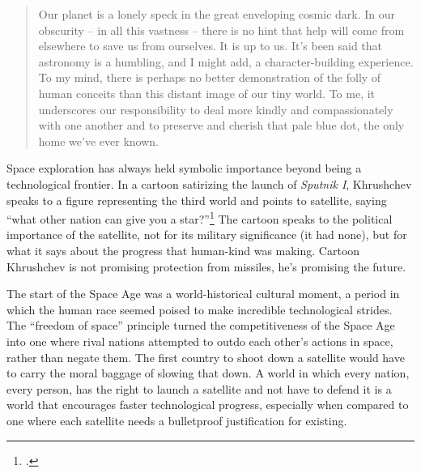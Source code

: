 \documentclass[11pt]{memoir}
\begin{document}
\begin{quote}
Our planet is a lonely speck in the great enveloping cosmic dark. In our obscurity – in all this vastness – there is no hint that help will come from elsewhere to save us from ourselves. It is up to us. It's been said that astronomy is a humbling, and I might add, a character-building experience. To my mind, there is perhaps no better demonstration of the folly of human conceits than this distant image of our tiny world. To me, it underscores our responsibility to deal more kindly and compassionately with one another and to preserve and cherish that pale blue dot, the only home we've ever known.
\end{quote}

Space exploration has always held symbolic importance beyond being a technological frontier. In a cartoon satirizing the launch of \emph{Sputnik I}, Khrushchev speaks to a figure representing the third world and points to satellite, saying ``what other nation can give you a star?''\footcite{mcdougall_heavens_1985} The cartoon speaks to the political importance of the satellite, not for its military significance (it had none), but for what it says about the progress that human-kind was making. Cartoon Khrushchev is not promising protection from missiles, he's promising the future.

The start of the Space Age was a world-historical cultural moment, a period in which the human race seemed poised to make incredible technological strides. The ``freedom of space'' principle turned the competitiveness of the Space Age into one where rival nations attempted to outdo each other's actions in space, rather than negate them. The first country to shoot down a satellite would have to carry the moral baggage of slowing that down. A world in which every nation, every person, has the right to launch a satellite and not have to defend it is a world that encourages faster technological progress, especially when compared to one where each satellite needs a bulletproof justification for existing.
\newpage
\printbibliography[heading=subbibliography]
\end{document}
